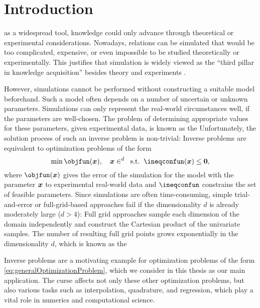 
\chapter{Introduction}
\label{chap:10introduction}

as a widespread tool,
knowledge could only advance through theoretical or
experimental considerations.
Nowadays, relations can be simulated
that would be too complicated, expensive, or even impossible
to be studied theoretically or experimentally.
This justifies that simulation is widely viewed as the
``third pillar in knowledge acquisition''
besides theory and experiments \cite{Bungartz14Modeling}.

However, simulations cannot be performed without constructing
a suitable model beforehand.
Such a model often depends on a number of uncertain or unknown parameters.
Simulations can only represent the real-world circumstances well,
if the parameters are well-chosen.
The problem of determining appropriate values for these parameters,
given experimental data, is known as the 
Unfortunately, the solution process of such an inverse problem is non-trivial:
Inverse problems are equivalent to optimization problems of the form
\begin{equation}
  \label{eq:generalOptimizationProblem}
  \min \objfun(\*x),\quad
  \*x \in \real^d\;\;\text{s.t.}\;\;
  \ineqconfun(\*x) \le \*0,
\end{equation}
where $\objfun(\*x)$ gives the error of the simulation for the model with
the parameter ${\boldsymbol{x}}$ to experimental real-world data and
$\ineqconfun$ constrains the set of feasible parameters.
Since simulations are often time-consuming,
simple trial-and-error or full-grid-based approaches fail
if the dimensionality $d$ is already moderately large ($d > 4$):
Full grid approaches sample each dimension of the domain
independently and construct the Cartesian product of the univariate
samples.
The number of resulting full grid points
grows exponentially in the dimensionality $d$,
which is known as the 

Inverse problems are a motivating example for optimization problems
of the form \eqref{eq:generalOptimizationProblem}, which we consider in
this thesis as our main application.
The curse affects not only these other optimization problems,
but also various tasks such as interpolation, quadrature, and regression,
which play a vital role in numerics and computational science.

